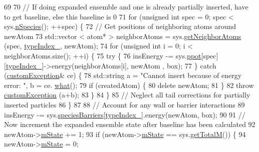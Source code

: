 \begin{DoxyCode}
69 
70         \textcolor{comment}{// If doing expanded ensemble and one is already partially inserted, have to get baseline, else
       this baseline is 0}
71         \textcolor{keywordflow}{for} (\textcolor{keywordtype}{unsigned} \textcolor{keywordtype}{int} spec = 0; spec < sys.\hyperlink{classsim_system_ab5e2e9b6204de15520302fe1d51688dd}{nSpecies}(); ++spec) \{
72             \textcolor{comment}{// Get positions of neighboring atoms around newAtom}
73             std::vector < atom* > neighborAtoms = sys.\hyperlink{classsim_system_a9b3aeefa22c3b50b5913df6eea753bc6}{getNeighborAtoms} (spec, 
      \hyperlink{classmc_move_acb731965547b0326ef318ec96da8b46a}{typeIndex\_}, newAtom);
74             \textcolor{keywordflow}{for} (\textcolor{keywordtype}{unsigned} \textcolor{keywordtype}{int} i = 0; i < neighborAtoms.size(); ++i) \{
75                 \textcolor{keywordflow}{try} \{
76                     insEnergy -= sys.\hyperlink{classsim_system_ad2e290b5963f132e6a3a56cee35c8e9f}{ppot}[spec][\hyperlink{classmc_move_acb731965547b0326ef318ec96da8b46a}{typeIndex\_}]->energy(neighborAtoms[i], newAtom
      , box);
77                 \} \textcolor{keywordflow}{catch} (\hyperlink{classcustom_exception}{customException}& ce) \{
78                     std::string a = \textcolor{stringliteral}{"Cannot insert because of energy error: "}, b = ce.
      \hyperlink{classcustom_exception_aeb6ab5848b038adfc68fde86a512f691}{what}();
79                     \textcolor{keywordflow}{if} (createdAtom) \{
80                         \textcolor{keyword}{delete} newAtom;
81                     \}
82                     \textcolor{keywordflow}{throw} \hyperlink{classcustom_exception}{customException} (a+b);
83                 \}
84             \}
85             \textcolor{comment}{// Neglect all tail corrections for partially inserted particles}
86         \}
87 
88         \textcolor{comment}{// Account for any wall or barrier interactions}
89         insEnergy -= sys.\hyperlink{classsim_system_a5ae652ff4519f39c3862abae32a9581b}{speciesBarriers}[\hyperlink{classmc_move_acb731965547b0326ef318ec96da8b46a}{typeIndex\_}].energy(newAtom, box);
90 
91         \textcolor{comment}{// Now increment the expanded ensemble state after baseline has been calculated}
92         newAtom->\hyperlink{classatom_a3cb00c0c5b7533657e05af6ff4a42740}{mState} += 1;
93         \textcolor{keywordflow}{if} (newAtom->\hyperlink{classatom_a3cb00c0c5b7533657e05af6ff4a42740}{mState} == sys.\hyperlink{classsim_system_aa4ad1afff101bb530e1590df05035276}{getTotalM}()) \{
94             newAtom->\hyperlink{classatom_a3cb00c0c5b7533657e05af6ff4a42740}{mState} = 0;

\end{DoxyCode}
